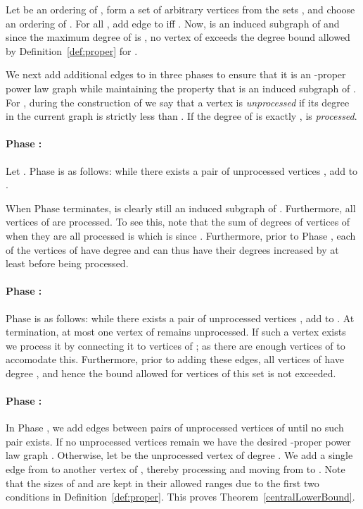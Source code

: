 \documentclass{article}
\theoremstyle{remark}
\begin{document}
Let  be an ordering of , form a set  of  arbitrary vertices from the sets , and choose an ordering  of . For all , add edge  to  iff . Now,  is an induced subgraph of  and since the maximum degree of  is , no vertex of  exceeds the degree bound allowed by Definition~\ref{def:proper} for .

We next add additional edges to  in three phases to ensure that it is an -proper power law graph while maintaining the property that  is an induced subgraph of . For , during the construction of  we say that a vertex  is \emph{unprocessed} if its degree in the current graph  is strictly less than . If the degree of  is exactly ,  is \emph{processed}.

\paragraph{Phase :}
Let . Phase  is as follows: while there exists a pair of unprocessed vertices , add  to .

When Phase  terminates,  is clearly still an induced subgraph of . Furthermore, all vertices of  are processed. To see this, note that the sum of degrees of vertices of  when they are all processed is  which is  since . Furthermore, prior to Phase , each of the  vertices of  have degree  and can thus have their degrees increased by at least  before being processed.

\paragraph{Phase :}
Phase  is as follows: while there exists a pair of unprocessed vertices , add  to . At termination, at most one vertex of  remains unprocessed. If such a vertex exists we process it by connecting it to  vertices of ; as  there are enough vertices of  to accomodate this. Furthermore, prior to adding these edges, all vertices of  have degree , and hence the bound allowed for vertices of this set is not exceeded.

\paragraph{Phase :}
In Phase , we add edges between pairs of unprocessed vertices of  until no such pair exists. If no unprocessed vertices remain we have the desired -proper power law graph . Otherwise, let  be the unprocessed vertex of degree . We add a single edge from  to another vertex  of , thereby processing  and moving  from  to . Note that the sizes of  and  are kept in their allowed ranges due to the first two conditions in Definition~\ref{def:proper}. This proves Theorem~\ref{centralLowerBound}.
\end{document}
